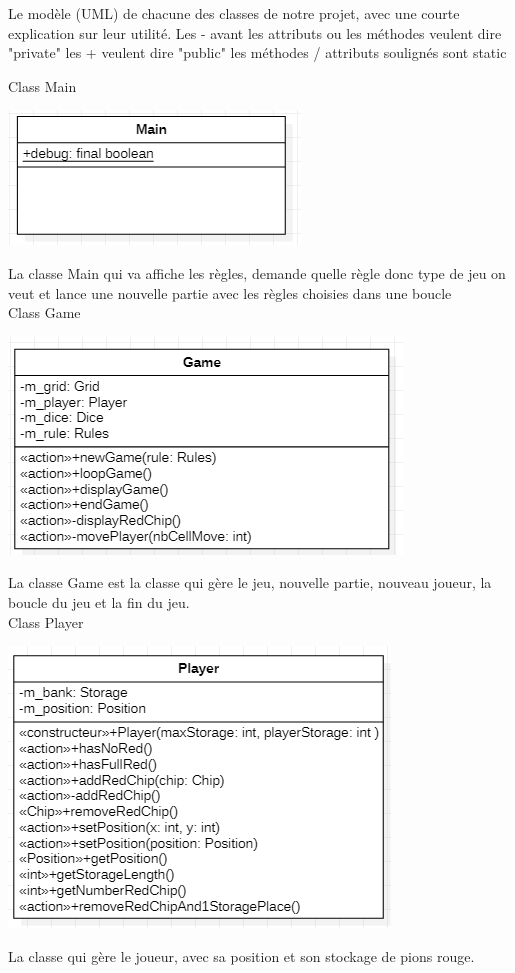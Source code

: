\usepackage{graphicx}
Le modèle (UML) de chacune des classes de notre projet, avec une courte explication sur leur utilité.
Les - avant les attributs ou les méthodes veulent dire "private"
les + veulent dire "public"
les méthodes / attributs soulignés sont static 


Class Main
\begin{center}
\includegraphics{Main.png}
\end{center}
La classe Main qui va affiche les règles, demande quelle règle donc type de jeu on veut et lance une nouvelle partie avec les règles choisies dans une boucle \\

Class Game
\begin{center}
\includegraphics{Game.png}
\end{center}
La classe Game est la classe qui gère le jeu, nouvelle partie, nouveau joueur, la boucle du jeu et la fin du jeu.\\


Class Player
\begin{center}
\includegraphics{Player.png}
\end{center}
La classe qui gère le joueur, avec sa position et son stockage de pions rouge. \\


